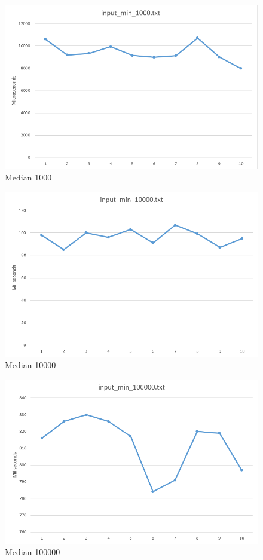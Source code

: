 \documentclass[a4paper, 12pt, titlepage]{article}
\begin{document}
\begin{figure}[H]
	\centering
	\caption{Median 1000}
	\includegraphics[width=.75\textwidth]{min1000.png} %
\end{figure}

\begin{figure}[H]
	\centering
	\caption{Median 10000}
	\includegraphics[width=.75\textwidth]{min10000.png} %
\end{figure}

\begin{figure}[H]
	\centering
	\caption{Median 100000}
	\includegraphics[width=.75\textwidth]{min100000.png} %
\end{figure}
\end{document}
